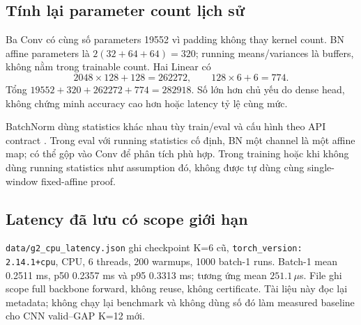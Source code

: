 \documentclass[11pt,a4paper]{article}
\newcommand{\code}[1]{{\small\ttfamily\nolinkurl{#1}}}
\theoremstyle{definition}
\begin{document}
\subsection{Tính lại parameter count lịch sử}
Ba Conv có cùng số parameters 19552 vì padding không thay kernel count.
BN affine parameters là $2(32+64+64)=320$; running means/variances là
buffers, không nằm trong trainable count. Hai Linear có
\begin{equation}
2048\times128+128=262272,\qquad128\times6+6=774.
\end{equation}
Tổng $19552+320+262272+774=282918$. Số lớn hơn chủ yếu do dense head,
không chứng minh accuracy cao hơn hoặc latency tỷ lệ cùng mức.

BatchNorm dùng statistics khác nhau tùy train/eval và cấu hình theo
API contract \cite{torchbn}. Trong eval với running statistics cố định,
BN một channel là một affine map; có thể gộp vào Conv để phân tích
phù hợp. Trong training hoặc khi không dùng running statistics như
assumption đó, không được tự dùng cùng single-window fixed-affine proof.

\subsection{Latency đã lưu có scope giới hạn}
\code{data/g2_cpu_latency.json} ghi checkpoint K=6 cũ,
\code{torch_version: 2.14.1+cpu}, CPU, 6 threads, 200 warmups,
1000 batch-1 runs. Batch-1 mean 0.2511 ms, p50 0.2357 ms và p95
0.3313 ms; tương ứng mean $251.1\,\mu$s. File ghi scope full backbone
forward, không reuse, không certificate. Tài liệu này đọc lại metadata;
không chạy lại benchmark và không dùng số đó làm measured baseline cho
CNN valid--GAP K=12 mới.
\end{document}
